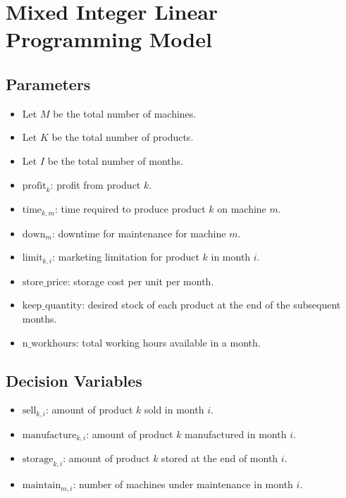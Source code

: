 \documentclass{article}
\begin{document}
\section*{Mixed Integer Linear Programming Model}

\subsection*{Parameters}
\begin{itemize}
    \item Let \( M \) be the total number of machines.
    \item Let \( K \) be the total number of products.
    \item Let \( I \) be the total number of months.
    \item \( \text{profit}_k \): profit from product \( k \).
    \item \( \text{time}_{k,m} \): time required to produce product \( k \) on machine \( m \).
    \item \( \text{down}_m \): downtime for maintenance for machine \( m \).
    \item \( \text{limit}_{k,i} \): marketing limitation for product \( k \) in month \( i \).
    \item \( \text{store\_price} \): storage cost per unit per month.
    \item \( \text{keep\_quantity} \): desired stock of each product at the end of the subsequent months.
    \item \( \text{n\_workhours} \): total working hours available in a month.
\end{itemize}

\subsection*{Decision Variables}
\begin{itemize}
    \item \( \text{sell}_{k,i} \): amount of product \( k \) sold in month \( i \).
    \item \( \text{manufacture}_{k,i} \): amount of product \( k \) manufactured in month \( i \).
    \item \( \text{storage}_{k,i} \): amount of product \( k \) stored at the end of month \( i \).
    \item \( \text{maintain}_{m,i} \): number of machines under maintenance in month \( i \).
\end{itemize}
\end{document}
